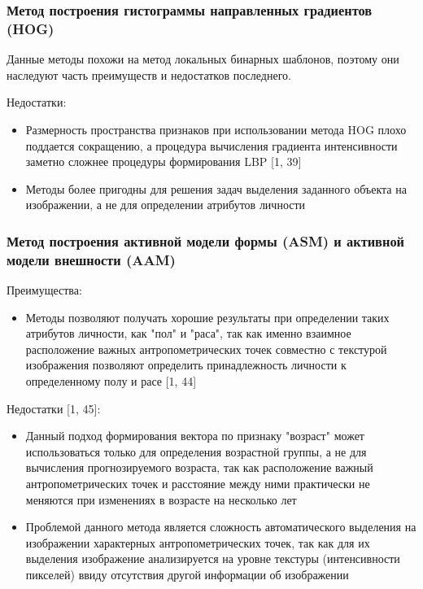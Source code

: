 \documentclass[12pt,a4paper]{article}
\begin{document}
\subsubsection{Метод построения гистограммы направленных градиентов (HOG)}
Данные методы похожи на метод локальных бинарных шаблонов, поэтому они наследуют часть преимуществ и недостатков последнего.

Недостатки:
\begin{itemize}
    \item Размерность пространства признаков при использовании метода HOG плохо поддается сокращению, а процедура вычисления градиента интенсивности заметно сложнее процедуры формирования LBP [1, 39]
    \item Методы более пригодны для решения задач выделения заданного объекта на изображении, а не для определении атрибутов личности
\end{itemize}

\subsubsection{Метод построения активной модели формы (ASM) и активной модели внешности (AAM)}
Преимущества:
\begin{itemize}
    \item Методы позволяют получать хорошие результаты при определении таких атрибутов личности, как "пол" и "раса", так как именно взаимное расположение важных антропометрических точек совместно с текстурой изображения позволяют определить принадлежность личности к определенному полу и расе [1, 44]
\end{itemize}

Недостатки [1, 45]:
\begin{itemize}
    \item Данный подход формирования вектора по признаку "возраст" может использоваться только для определения возрастной группы, а не для вычисления прогнозируемого возраста, так как расположение важный антропометрических точек и расстояние между ними практически не меняются при изменениях в возрасте на несколько лет
    \item Проблемой данного метода является сложность автоматического выделения на изображении характерных антропометрических точек, так как для их выделения изображение анализируется на уровне текстуры (интенсивности пикселей) ввиду отсутствия другой информации об изображении
\end{itemize}
\end{document}
